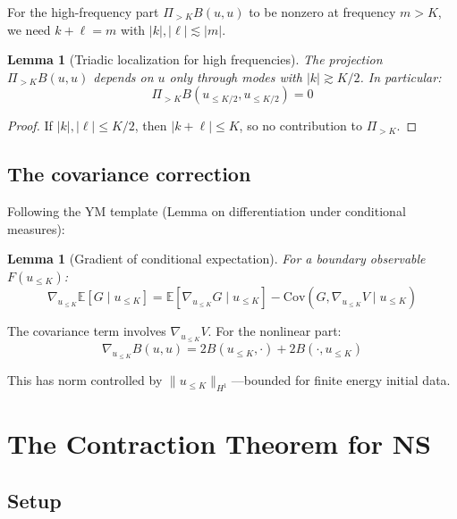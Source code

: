 \documentclass[11pt]{article}
\newtheorem{lemma}[theorem]{Lemma}
\theoremstyle{definition}
\newcommand{\E}{\mathbb{E}}
\newcommand{\Cov}{\mathrm{Cov}}
\begin{document}
For the high-frequency part $\Pi_{>K} B(u,u)$ to be nonzero at frequency $m > K$, we need 
$k + \ell = m$ with $|k|, |\ell| \lesssim |m|$.

\begin{lemma}[Triadic localization for high frequencies]
The projection $\Pi_{>K} B(u,u)$ depends on $u$ only through modes with $|k| \gtrsim K/2$.
In particular:
\begin{equation}
\Pi_{>K} B(u_{\leq K/2}, u_{\leq K/2}) = 0
\end{equation}
\end{lemma}

\begin{proof}
If $|k|, |\ell| \leq K/2$, then $|k+\ell| \leq K$, so no contribution to $\Pi_{>K}$.
\end{proof}

\subsection{The covariance correction}

Following the YM template (Lemma on differentiation under conditional measures):

\begin{lemma}[Gradient of conditional expectation]
For a boundary observable $F(u_{\leq K})$:
\begin{equation}
\nabla_{u_{\leq K}} \E[G \mid u_{\leq K}] = \E[\nabla_{u_{\leq K}} G \mid u_{\leq K}] 
- \Cov(G, \nabla_{u_{\leq K}} V \mid u_{\leq K})
\end{equation}
\end{lemma}

The covariance term involves $\nabla_{u_{\leq K}} V$. For the nonlinear part:
\begin{equation}
\nabla_{u_{\leq K}} B(u,u) = 2B(u_{\leq K}, \cdot) + 2B(\cdot, u_{\leq K})
\end{equation}

This has norm controlled by $\|u_{\leq K}\|_{H^1}$---bounded for finite energy initial data.

\section{The Contraction Theorem for NS}

\subsection{Setup}
\end{document}
